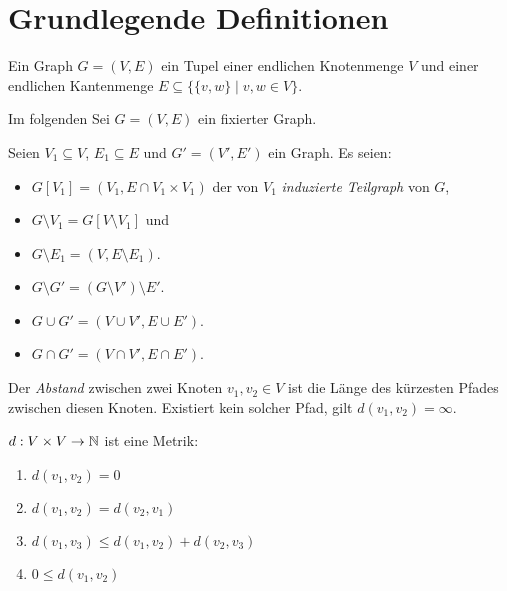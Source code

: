 \chapter{Grundlegende Definitionen}

\begin{definition}[Graph]
    Ein Graph $ G = (V, E) $ ein Tupel einer endlichen Knotenmenge $ V $ und einer endlichen Kantenmenge $ E \subseteq \{ \{ v, w \} \mid v, w \in V \} $.
\end{definition}

Im folgenden Sei $ G = (V, E) $ ein fixierter Graph.

\begin{definition}
    Seien $ V_1 \subseteq V $, $ E_1 \subseteq E $ und $ G' = (V', E') $ ein Graph.
    Es seien:
    \begin{itemize}
        \item $ G[V_1] = (V_1, E \cap V_1 \times V_1) $ der von $ V_1 $ \textit{induzierte Teilgraph} von $ G $,
        \item $ G \setminus V_1 = G[V \setminus V_1] $ und
        \item $ G \setminus E_1 = (V, E \setminus E_1) $.
        \item $ G \setminus G' = (G \setminus V') \setminus E' $.
        \item $ G \cup G' = (V \cup V', E \cup E') $.
        \item $ G \cap G' = (V \cap V', E \cap E') $.
    \end{itemize}
\end{definition}

\begin{definition}[Abstand]
    Der \textit{Abstand} zwischen zwei Knoten $ v_1, v_2 \in V $ ist die Länge des kürzesten Pfades zwischen diesen Knoten.
    Existiert kein solcher Pfad, gilt $ d(v_1, v_2) = \infty $.
\end{definition}

\begin{observation}
    $ d : V \times V \rightarrow \mathbb{N} $ ist eine Metrik:
    \begin{enumerate}
        \item $ d(v_1, v_2) = 0 $
        \item $ d(v_1, v_2) = d(v_2, v_1) $
        \item $ d(v_1, v_3) \leq d(v_1, v_2) + d(v_2, v_3) $
        \item $ 0 \leq d(v_1, v_2) $
    \end{enumerate}
\end{observation}

